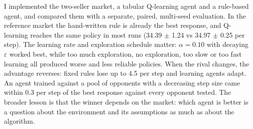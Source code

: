 \documentclass[11pt, a4paper]{article}
\begin{document}
I implemented the two-seller market, a tabular Q-learning agent and a rule-based agent, and compared them with a separate, paired, multi-seed evaluation. In the reference market the hand-written rule is already the best response, and Q-learning reaches the same policy in most runs (34.39 $\pm$ 1.24 vs 34.97 $\pm$ 0.25 per step). The learning rate and exploration schedule matter: $\alpha = 0.10$ with decaying $\varepsilon$ worked best, while too much exploration, no exploration, too slow or too fast learning all produced worse and less reliable policies. When the rival changes, the advantage reverses: fixed rules lose up to 4.5 per step and learning agents adapt. An agent trained against a pool of opponents with a decreasing step size came within 0.3 per step of the best response against every opponent tested. The broader lesson is that the winner depends on the market: which agent is better is a question about the environment and its assumptions as much as about the algorithm.
\end{document}
